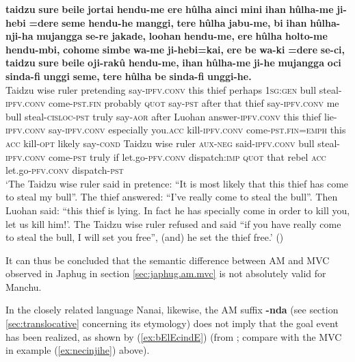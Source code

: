 \documentclass{article}
\newcommand{\ipa}[1]{\textbf{{\phon\mbox{#1}}}} %
\begin{document}
\begin{exe}
\ex \label{ex:huulhanjiha}
\gll
\ipa{taidzu} 	\ipa{sure} 	\ipa{beile} 	\ipa{jortai} 	\ipa{hendu-me} 	\ipa{ere} 	\ipa{hûlha} 	\ipa{ainci} 	\ipa{mini} 	\ipa{ihan} 	\ipa{hûlha-me} 	\ipa{ji-hebi} 	\ipa{=dere} 	\ipa{seme} 	\ipa{hendu-he} 	\ipa{manggi,} 	\ipa{tere} 	\ipa{hûlha} 	\ipa{jabu-me,} 	\ipa{bi} 	\ipa{ihan} 	\ipa{hûlha-nji-ha} 	\ipa{mujangga} 	\ipa{se-re} 	\ipa{jakade,} 	\ipa{loohan} 	\ipa{hendu-me,} 	\ipa{ere} 	\ipa{hûlha} 	\ipa{holto-me} 	\ipa{hendu-mbi,} 	\ipa{cohome} 	\ipa{simbe} 	\ipa{wa-me} 	\ipa{ji-hebi=kai,} 	\ipa{ere} 	\ipa{be} 	\ipa{wa-ki} 	\ipa{=dere} 	\ipa{se-ci,} 	\ipa{taidzu} 	\ipa{sure} 	\ipa{beile} 	\ipa{oji-rakû} 	\ipa{hendu-me,} 	\ipa{ihan} 	\ipa{hûlha-me} 	\ipa{ji-he} 	\ipa{mujangga} 	\ipa{oci} 	\ipa{sinda-fi} 	\ipa{unggi} 	\ipa{seme,} 	\ipa{tere} 	\ipa{hûlha} 	\ipa{be} 	\ipa{sinda-fi} 	\ipa{unggi-he.} \\
Taidzu wise ruler pretending say-\textsc{ipfv.conv} this thief perhaps \textsc{1sg:gen} bull steal-\textsc{ipfv.conv} come-\textsc{pst.fin} probably \textsc{quot} say-\textsc{pst} after that thief say-\textsc{ipfv.conv} me bull steal-\textsc{cisloc-pst} truly say-\textsc{aor} after Luohan answer-\textsc{ipfv.conv} this thief lie-\textsc{ipfv.conv} say-\textsc{ipfv.conv} especially you.\textsc{acc} kill-\textsc{ipfv.conv} come-\textsc{pst.fin}=\textsc{emph} this \textsc{acc} kill-\textsc{opt} likely say-\textsc{cond} Taidzu wise ruler \textsc{aux-neg} said-\textsc{ipfv.conv} bull steal-\textsc{ipfv.conv} come-\textsc{pst} truly if let.go-\textsc{pfv.conv} dispatch:\textsc{imp} \textsc{quot} that rebel \textsc{acc} let.go-\textsc{pfv.conv} dispatch-\textsc{pst} \\
\glt  `The Taidzu wise ruler said in pretence: “It is most likely that this thief has come to steal my bull”. The thief answered: “I’ve really come to steal the bull”. Then Luohan said: “this thief is lying. In fact he has specially come in order to kill you, let us kill him!’. The Taidzu wise ruler refused and said “if you have really come to steal the bull, I will set you free”, (and) he set the thief free.' (\citealt[35;171-172]{shunjuu92yargiyan})
\end{exe}


It can thus be concluded that the semantic difference between AM and MVC observed in Japhug in section \ref{sec:japhug.am.mvc} is not absolutely valid for Manchu.

In the closely related language Nanai, likewise, the AM suffix  \ipa{-nda} (see section \ref{sec:translocative} concerning its etymology) does not imply that the goal event has been realized, as shown by (\ref{ex:bElEcindE}) (from \citealt[89]{stojnova16nda}; compare with the MVC in example (\ref{ex:necinjihe}) above).
\end{document}

